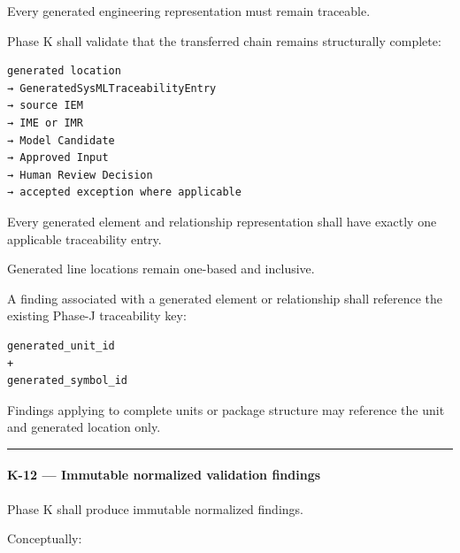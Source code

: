 Every generated engineering representation must remain traceable.

Phase K shall validate that the transferred chain remains structurally complete:

\begin{verbatim}
generated location
→ GeneratedSysMLTraceabilityEntry
→ source IEM
→ IME or IMR
→ Model Candidate
→ Approved Input
→ Human Review Decision
→ accepted exception where applicable
\end{verbatim}

Every generated element and relationship representation shall have exactly one applicable traceability entry.

Generated line locations remain one-based and inclusive.

A finding associated with a generated element or relationship shall reference the existing Phase-J traceability key:

\begin{verbatim}
generated_unit_id
+
generated_symbol_id
\end{verbatim}

Findings applying to complete units or package structure may reference the unit and generated location only.

\begin{center}\rule{0.5\linewidth}{0.5pt}\end{center}

\hypertarget{k-12--immutable-normalized-validation-findings}{%
\paragraph{K-12 --- Immutable normalized validation findings}\label{k-12--immutable-normalized-validation-findings}}

Phase K shall produce immutable normalized findings.

Conceptually:

\begin{Shaded}
\begin{Highlighting}[]
\OperatorTok{=}
\OperatorTok{=}
\OperatorTok{=}
\OperatorTok{=}
\OperatorTok{=}
\OperatorTok{=}
\OperatorTok{=}
\OperatorTok{=}
\OperatorTok{=}
\OperatorTok{=}
\NormalTok{)}
\end{Highlighting}
\end{Shaded}

